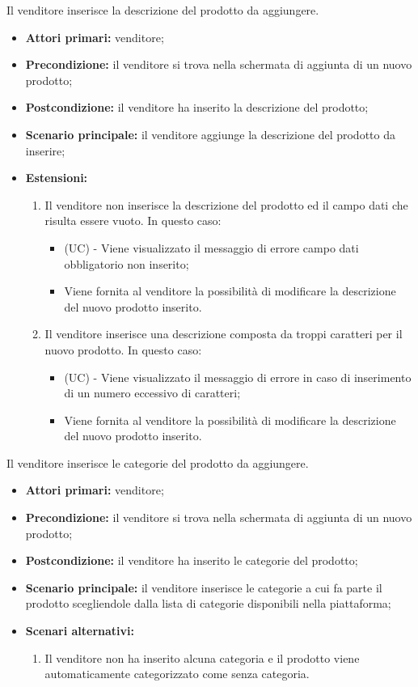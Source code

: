 Il venditore inserisce la descrizione del prodotto da aggiungere.
\begin{itemize}
    \item \textbf{Attori primari:} venditore;
    \item \textbf{Precondizione:} il venditore si trova nella schermata di aggiunta di un nuovo prodotto;
    \item \textbf{Postcondizione:} il venditore ha inserito la descrizione del prodotto;
    \item \textbf{Scenario principale:} il venditore aggiunge la descrizione del prodotto da inserire;
    \item \textbf{Estensioni:}
    \begin{enumerate}[label=\lett]
    	\item Il venditore non inserisce la descrizione del prodotto ed il campo dati che risulta essere vuoto. In questo caso:
    	\begin{itemize}
    		\item (UC) - Viene visualizzato il messaggio di errore campo dati obbligatorio non inserito;
    		\item Viene fornita al venditore la possibilità di modificare la descrizione del nuovo prodotto inserito.
    	\end{itemize}
        \item Il venditore inserisce una descrizione composta da troppi caratteri per il nuovo prodotto. In questo caso:
	    \begin{itemize}
    		\item (UC) - Viene visualizzato il messaggio di errore in caso di inserimento di un numero eccessivo di caratteri;
	    	\item Viene fornita al venditore la possibilità di modificare la descrizione del nuovo prodotto inserito.
	    \end{itemize}
    \end{enumerate}
\end{itemize}

Il venditore inserisce le categorie del prodotto da aggiungere.
\begin{itemize}
    \item \textbf{Attori primari:} venditore;
    \item \textbf{Precondizione:} il venditore si trova nella schermata di aggiunta di un nuovo prodotto;
    \item \textbf{Postcondizione:} il venditore ha inserito le categorie del prodotto;
    \item \textbf{Scenario principale:} il venditore inserisce le categorie a cui fa parte il prodotto scegliendole dalla lista di categorie disponibili nella piattaforma;
    \item \textbf{Scenari alternativi:}
    \begin{enumerate}[label=\lett]
    	\item Il venditore non ha inserito alcuna categoria e il prodotto viene automaticamente categorizzato come senza categoria.
    \end{enumerate}
\end{itemize}

